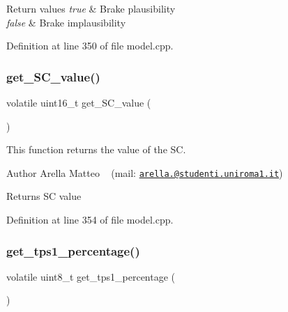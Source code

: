 \begin{DoxyRetVals}{Return values}
{\em true} & Brake plausibility \\
\hline
{\em false} & Brake implausibility \\
\hline
\end{DoxyRetVals}


Definition at line 350 of file model.\+cpp.

\mbox{\label{group___board__model__group_ga36eddbc000c8d1820fd2a644a39c87ea}} 
\subsubsection{\texorpdfstring{get\+\_\+\+S\+C\+\_\+value()}{get\_SC\_value()}}
{\footnotesize\ttfamily volatile uint16\+\_\+t get\+\_\+\+S\+C\+\_\+value (\begin{DoxyParamCaption}{ }\end{DoxyParamCaption})}



This function returns the value of the SC. 

\begin{DoxyAuthor}{Author}
Arella Matteo ~\newline
 (mail\+: \href{mailto:arella.1646983@studenti.uniroma1.it}{\tt arella.@studenti.\+uniroma1.\+it})
\end{DoxyAuthor}
\begin{DoxyReturn}{Returns}
SC value 
\end{DoxyReturn}


Definition at line 354 of file model.\+cpp.

\mbox{\label{group___board__model__group_ga9239a95f68fab3d9b6832fbe85eb87cd}} 
\subsubsection{\texorpdfstring{get\+\_\+tps1\+\_\+percentage()}{get\_tps1\_percentage()}}
{\footnotesize\ttfamily volatile uint8\+\_\+t get\+\_\+tps1\+\_\+percentage (\begin{DoxyParamCaption}{ }\end{DoxyParamCaption})}



